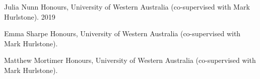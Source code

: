 


\begin{cvhonors}

  \cvhonor
    {Julia Nunn} %
    {Honours, University of Western Australia (co-supervised with Mark Hurlstone).} %
    {} %
    {2019} %

  \cvhonor
    {Emma Sharpe} %
    {Honours, University of Western Australia (co-supervised with Mark Hurlstone).} %
    {} %
    {} %

  \cvhonor
    {Matthew Mortimer} %
    {Honours, University of Western Australia (co-supervised with Mark Hurlstone).} %
    {} %
    {} %

\end{cvhonors}
